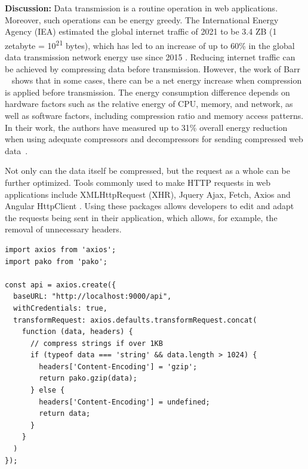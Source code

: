 \textbf{Discussion:} Data transmission is a routine operation in web applications. Moreover, such operations can be energy greedy. The International Energy Agency (IEA) estimated the global internet traffic of 2021 to be 3.4 ZB (1 zetabyte = 10\textsuperscript{21} bytes), which has led to an increase of up to 60\% in the global data transmission network energy use since 2015 \cite{data_transmission_of_data_centers}. Reducing internet traffic can be achieved by compressing data before transmission. However, the work of Barr \etal ~\cite{Barr2006}  shows that in some cases, there can be a net energy increase when compression is applied before transmission. The energy consumption difference depends on hardware factors such as the relative energy of CPU, memory, and network, as well as software factors, including compression ratio and memory access patterns. In their work, the authors have measured up to 31\% overall energy reduction when using adequate compressors and decompressors for sending compressed web data~\cite{Barr2006}.

Not only can the data itself be compressed, but the request as a whole can be further optimized. Tools commonly used to make HTTP requests in web applications include XMLHttpRequest (XHR), Jquery Ajax, Fetch, Axios and Angular HttpClient \cite{Angular_Http_Client}. Using these packages allows developers to edit and adapt the requests being sent in their application, which allows, for example, the removal of unnecessary headers.

\begin{minipage}{0.95\linewidth}
    \begin{lstlisting}[caption={Impelemtation of data compression on strings larger than 1KB \cite{reduceSizeExample}
    }, label={reducesizecode}]
import axios from 'axios';
import pako from 'pako';

const api = axios.create({
  baseURL: "http://localhost:9000/api",
  withCredentials: true,
  transformRequest: axios.defaults.transformRequest.concat(
    function (data, headers) {
      // compress strings if over 1KB
      if (typeof data === 'string' && data.length > 1024) {
        headers['Content-Encoding'] = 'gzip';
        return pako.gzip(data);
      } else {
        headers['Content-Encoding'] = undefined;
        return data;
      }
    }
  )
});
    \end{lstlisting}
\end{minipage}

